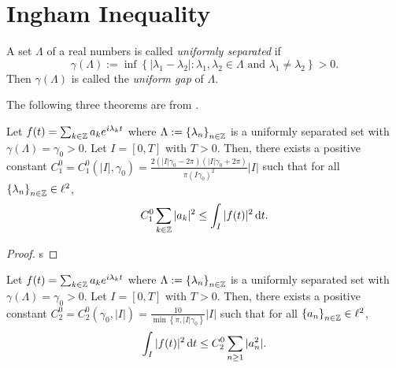 \section{Ingham Inequality}
\begin{definition}
  A set $\Lambda$ of a real numbers is called \textit{uniformly separated} if 
  \begin{equation}
    \gamma(\Lambda):=\inf \left\{|\lambda_1-\lambda_2|:\lambda_1,\lambda_2\in \Lambda \text{ and }\lambda_1\neq \lambda_2\right\} >0.
  \end{equation}
  Then $\gamma(\Lambda)$ is called the \textit{uniform gap} of $\Lambda$.
\end{definition}

The following three theorems are from \cite{Jaffard}.
\begin{theorem}\label{thm-1}
  Let $f(t)=\sum_{k\in \mathbb{Z}} a_k e^{i\lambda_k t}$ where $\Lambda:=\left\{\lambda_n\right\} _{n\in \mathbb{Z}}$ is a uniformly separated set with $\gamma(\Lambda)=\gamma_0>0$. Let $I=[0,T]$ with $T>0$. Then, there exists a positive constant $C_1^{0}=C_1^{0}(|I|,\gamma_0)=\frac{2\left( |I|\gamma_0-2\pi \right) \left( |I|\gamma_0+2\pi \right) }{\pi(I\gamma_0)^2}|I| $ such that for all $\left\{\lambda_n\right\} _{n\in \mathbb{Z}}\in \ell^2$,
\begin{equation}
  C_1^{0}\sum_{k\in \mathbb{Z}}^{} |a_k|^2\le \int_{I}|f(t)|^2\,\mathrm{d} t.
\end{equation}
\end{theorem}
\begin{proof}
  s
\end{proof}
\begin{theorem}\label{thm-2}
  Let $f(t)=\sum_{k\in \mathbb{Z}}a_k e^{i \lambda_kt}$ where $\Lambda:=\left\{\lambda_n\right\} _{n\in \mathbb{Z}}$ is a uniformly separated set with $\gamma(\Lambda)=\gamma_0>0$. Let $I=[0,T]$ with  $T>0$. Then, there exists a positive constant $C_2^0=C_2^0(\gamma_0,|I|)=\frac{10}{\min \left\{\pi,|I|\gamma_0\right\} }|I|$ such that for all $\left\{a_n\right\} _{n\in \mathbb{Z}}\in \ell^2$,
  \begin{equation}
    \int_{I}|f(t)|^2\,\mathrm{d} t\le C_2^0 \sum_{n\ge 1}^{} |a_n^2|.
  \end{equation}
\end{theorem}

